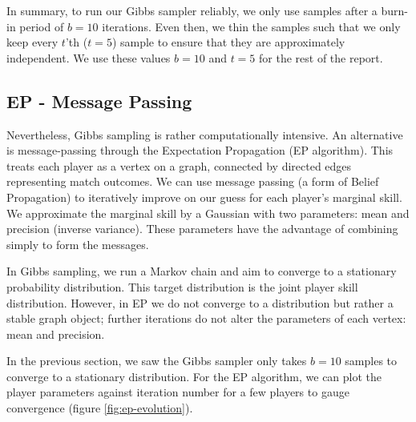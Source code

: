\documentclass[]{article}
\begin{document}
In summary, to run our Gibbs sampler reliably, we only use samples after a burn-in period of $b=10$ iterations. Even then, we thin the samples such that we only keep every $t$'th ($t=5$) sample to ensure that they are approximately independent. We use these values $b=10$ and $t=5$ for the rest of the report.

\subsection{EP - Message Passing}

Nevertheless, Gibbs sampling is rather computationally intensive. An alternative is message-passing through the Expectation Propagation (EP algorithm). This treats each player as a vertex on a graph, connected by directed edges representing match outcomes. We can use message passing (a form of Belief Propagation) to iteratively improve on our guess for each player's marginal skill. We approximate the marginal skill by a Gaussian with two parameters: mean and precision (inverse variance). These parameters have the advantage of combining simply to form the messages.

In Gibbs sampling, we run a Markov chain and aim to converge to a stationary probability distribution. This target distribution is the joint player skill distribution. However, in EP we do not converge to a distribution but rather a stable graph object; further iterations do not alter the parameters of each vertex: mean and precision.

In the previous section, we saw the Gibbs sampler only takes $b=10$ samples to converge to a stationary distribution. For the EP algorithm, we can plot the player parameters against iteration number for a few players to gauge convergence (figure \ref{fig:ep-evolution}).
\end{document}
